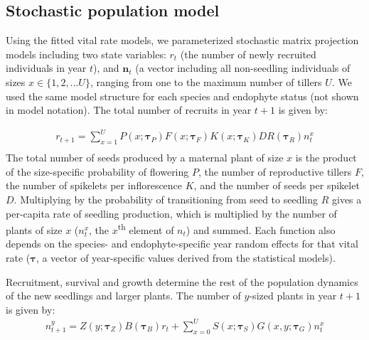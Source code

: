 \documentclass[9pt,twocolumn,twoside]{pnas-new}
\begin{document}
{\subsection*{Stochastic population model}
Using the fitted vital rate models, we parameterized stochastic matrix projection models including two state variables: $r_{t}$ (the number of newly recruited individuals in year $t$), and $\textbf{n}_{t}$ (a vector including all non-seedling individuals of sizes $x\in\{1,2,...U\} $, ranging from one to the maximum number of tillers $U$. 
We used the same model structure for each species and endophyte status (not shown in model notation). 
The total number of recruits in year $t+1$ is given by:

\begin{equation} 
	\label{eq:MPM_F}
	\begin{aligned}
		r_{t+1} = \sum_{x=1}^{U} P(x; \pmb{\tau}_{P})F(x; \pmb{\tau}_{F})K(x; \pmb{\tau}_{K})DR(\pmb{\tau}_{R}) n^x_{t}\\
	\end{aligned}
\end{equation}
The total number of seeds produced by a maternal plant of size $x$ is the product of the size-specific probability of flowering $P$, the number of reproductive tillers $F$, the number of spikelets per inflorescence $K$, and the number of seeds per spikelet $D$. 
Multiplying by the probability of transitioning from seed to seedling $R$ gives a per-capita rate of seedling production, which is multiplied by the number of plants of size $x$ ($n^x_{t}$, the $x$\textsuperscript{th} element of \textbf{$n_{t}$}) and summed. 
Each function also depends on the species- and endophyte-specific year random effects for that vital rate ($\pmb{\tau}$, a vector of year-specific values derived from the statistical models). 

Recruitment, survival and growth determine the rest of the population dynamics of the new seedlings and larger plants. 
The number of $y$-sized plants in year $t+1$ is given by:
\begin{equation} 
	\label{eq:MPM_T}
	\begin{aligned}
		n^y_{t+1} = Z(y; \pmb{\tau}_{Z})B(\pmb{\tau}_{B})r_{t}  + 
		\sum_{x=0}^{U} S(x; \pmb{\tau}_{S})G(x,y; \pmb{\tau}_{G}) n^x_{t}\\
	\end{aligned}
\end{equation}

}
\end{document}
